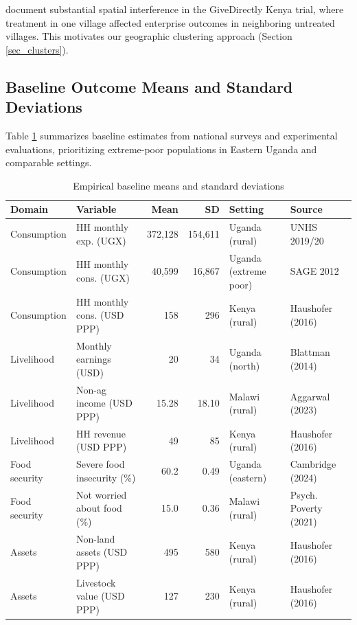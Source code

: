 \documentclass[12pt, oneside]{amsart}
\numberwithin{equation}{section}
\begin{document}
\citet{egger2022general} document substantial spatial interference in the GiveDirectly Kenya trial, where treatment in one village affected enterprise outcomes in neighboring untreated villages. This motivates our geographic clustering approach (Section \ref{sec_clusters}).

\subsection{Baseline Outcome Means and Standard Deviations}

Table \ref{tab:baseline} summarizes baseline estimates from national surveys and experimental evaluations, prioritizing extreme-poor populations in Eastern Uganda and comparable settings.

\begin{table}[H]
\centering
\small
\caption{Empirical baseline means and standard deviations}
\label{tab:baseline}
\begin{tabular}{llrrll}
\toprule
Domain & Variable & Mean & SD & Setting & Source \\
\midrule
Consumption & HH monthly exp. (UGX) & 372,128 & 154,611 & Uganda (rural) & UNHS 2019/20 \\
Consumption & HH monthly cons. (UGX) & 40,599 & 16,867 & Uganda (extreme poor) & SAGE 2012 \\
Consumption & HH monthly cons. (USD PPP) & 158 & 296 & Kenya (rural) & Haushofer (2016) \\
\midrule
Livelihood & Monthly earnings (USD) & 20 & 34 & Uganda (north) & Blattman (2014) \\
Livelihood & Non-ag income (USD PPP) & 15.28 & 18.10 & Malawi (rural) & Aggarwal (2023) \\
Livelihood & HH revenue (USD PPP) & 49 & 85 & Kenya (rural) & Haushofer (2016) \\
\midrule
Food security & Severe food insecurity (\%) & 60.2 & 0.49 & Uganda (eastern) & Cambridge (2024) \\
Food security & Not worried about food (\%) & 15.0 & 0.36 & Malawi (rural) & Psych. Poverty (2021) \\
\midrule
Assets & Non-land assets (USD PPP) & 495 & 580 & Kenya (rural) & Haushofer (2016) \\
Assets & Livestock value (USD PPP) & 127 & 230 & Kenya (rural) & Haushofer (2016) \\
\bottomrule
\end{tabular}
\end{table}
\end{document}
